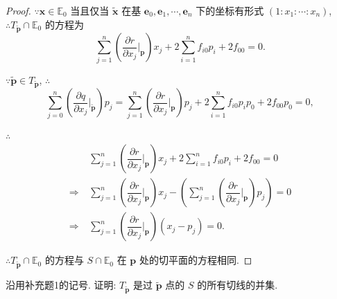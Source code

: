 \documentclass[color=black,device=normal,lang=cn,mode=geye]{elegantnote}
\begin{document}
\begin{proof}
    $\because\boldsymbol{x}\in\mathbb{E}_0$ 当且仅当 $\tilde{\boldsymbol{x}}$ 在基 $\boldsymbol{e}_0,\boldsymbol{e}_1,\cdots,\boldsymbol{e}_n$ 下的坐标有形式 $(1:x_1:\cdots:x_n)$, $\therefore T_{\tilde{\boldsymbol{p}}}\cap\mathbb{E}_0$ 的方程为
    \[\sum\limits_{j=1}^n\left(\dfrac{\partial r}{\partial x_j}\bigg|_{\boldsymbol{p}}\right)x_j+2\sum\limits_{i=1}^nf_{i0}p_i+2f_{00}=0.\]

    $\because\tilde{\boldsymbol{p}}\in T_{\tilde{\boldsymbol{p}}}$, $\therefore$
    \[\sum\limits_{j=0}^n\left(\dfrac{\partial q}{\partial x_j}\bigg|_{\tilde{\boldsymbol{p}}}\right)p_j=\sum\limits_{j=1}^n\left(\dfrac{\partial r}{\partial x_j}\bigg|_{\boldsymbol{p}}\right)p_j+2\sum\limits_{i=1}^nf_{i0}p_ip_0+2f_{00}p_0=0,\]

    $\therefore$
    \begin{align*}
        & \sum\limits_{j=1}^n\left(\dfrac{\partial r}{\partial x_j}\bigg|_{\boldsymbol{p}}\right)x_j+2\sum\limits_{i=1}^nf_{i0}p_i+2f_{00}=0 \\
        \Rightarrow\ & \sum\limits_{j=1}^n\left(\dfrac{\partial r}{\partial x_j}\bigg|_{\boldsymbol{p}}\right)x_j-\left(\sum\limits_{j=1}^n\left(\dfrac{\partial r}{\partial x_j}\bigg|_{\boldsymbol{p}}\right)p_j\right)=0 \\
        \Rightarrow\ & \sum\limits_{j=1}^n\left(\dfrac{\partial r}{\partial x_j}\bigg|_{\boldsymbol{p}}\right)(x_j-p_j)=0.
    \end{align*}

    $\therefore T_{\tilde{\boldsymbol{p}}}\cap\mathbb{E}_0$ 的方程与 $S\cap\mathbb{E}_0$ 在 $\boldsymbol{p}$ 处的切平面的方程相同.
\end{proof}
\begin{exercisec}%
    沿用补充题1的记号. 证明: $T_{\tilde{\boldsymbol{p}}}$ 是过 $\tilde{\boldsymbol{p}}$ 点的 $S$ 的所有切线的并集.
\end{exercisec}
\end{document}
